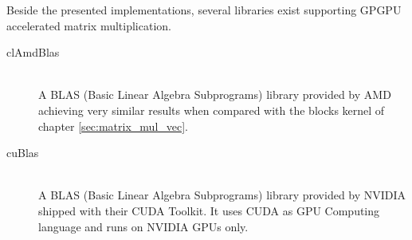 Beside the presented implementations, several libraries exist supporting GPGPU accelerated matrix multiplication.

\begin{description}
   \item[clAmdBlas \cite{cl_amd_blas}] \hfill \\
   A BLAS (Basic Linear Algebra Subprograms) library provided by AMD achieving very similar results when compared with the blocks kernel of chapter \ref{sec:matrix_mul_vec}. 
   \item[cuBlas \cite{cublas}] \hfill \\
   A BLAS (Basic Linear Algebra Subprograms) library provided by NVIDIA shipped with their CUDA Toolkit. It uses CUDA as GPU Computing language and runs on NVIDIA GPUs only.
\end{description}
